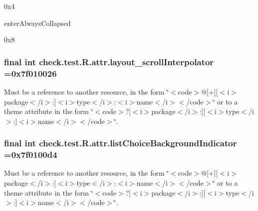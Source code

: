 0x4

{\ttfamily enter\+Always\+Collapsed}

0x8\hypertarget{classcheck_1_1test_1_1_r_1_1attr_adac9c4882ddd233e198cfa1a87d563d1}{}
\subsubsection[{layout\+\_\+scroll\+Interpolator}]{\setlength{\rightskip}{0pt plus 5cm}final int check.\+test.\+R.\+attr.\+layout\+\_\+scroll\+Interpolator =0x7f010026\hspace{0.3cm}{\ttfamily [static]}}\label{classcheck_1_1test_1_1_r_1_1attr_adac9c4882ddd233e198cfa1a87d563d1}
Must be a reference to another resource, in the form \char`\"{}$<$code$>$@\mbox{[}+\mbox{]}\mbox{[}$<$i$>$package$<$/i$>$\+:\mbox{]}$<$i$>$type$<$/i$>$\+:$<$i$>$name$<$/i$>$$<$/code$>$\char`\"{} or to a theme attribute in the form \char`\"{}$<$code$>$?\mbox{[}$<$i$>$package$<$/i$>$\+:\mbox{]}\mbox{[}$<$i$>$type$<$/i$>$\+:\mbox{]}$<$i$>$name$<$/i$>$$<$/code$>$\char`\"{}. \hypertarget{classcheck_1_1test_1_1_r_1_1attr_ae62397dfd4fd28583456ecf25a611d85}{}
\subsubsection[{list\+Choice\+Background\+Indicator}]{\setlength{\rightskip}{0pt plus 5cm}final int check.\+test.\+R.\+attr.\+list\+Choice\+Background\+Indicator =0x7f0100d4\hspace{0.3cm}{\ttfamily [static]}}\label{classcheck_1_1test_1_1_r_1_1attr_ae62397dfd4fd28583456ecf25a611d85}
Must be a reference to another resource, in the form \char`\"{}$<$code$>$@\mbox{[}+\mbox{]}\mbox{[}$<$i$>$package$<$/i$>$\+:\mbox{]}$<$i$>$type$<$/i$>$\+:$<$i$>$name$<$/i$>$$<$/code$>$\char`\"{} or to a theme attribute in the form \char`\"{}$<$code$>$?\mbox{[}$<$i$>$package$<$/i$>$\+:\mbox{]}\mbox{[}$<$i$>$type$<$/i$>$\+:\mbox{]}$<$i$>$name$<$/i$>$$<$/code$>$\char`\"{}. \hypertarget{classcheck_1_1test_1_1_r_1_1attr_afac1cbbb1b94904e17111d40e56cd3dd}{}
